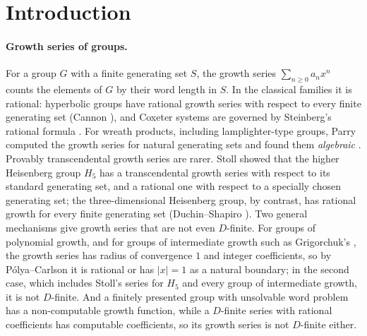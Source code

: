 \documentclass[11pt]{article}
\theoremstyle{plain}
\theoremstyle{definition}
\theoremstyle{remark}
\theoremstyle{plain}\newtheorem*{maintheorem}{Main Theorem}
\begin{document}
\section{Introduction}\label{sec:intro}

\paragraph{Growth series of groups.} For a group $G$ with a finite generating set $S$, the growth
series $\sum_{n\ge0}a_nx^n$ counts the elements of $G$ by their word length in $S$. In the
classical families it is rational: hyperbolic groups have rational growth series with respect to
every finite generating set (Cannon \cite{Cannon1984}), and Coxeter systems are governed by
Steinberg's rational formula \cite[\S5.12]{Humphreys1990}. For wreath products, including
lamplighter-type groups, Parry computed the growth series for natural generating sets and found
them \emph{algebraic} \cite{Parry1992}. Provably transcendental growth series are rarer. Stoll
\cite{Stoll1996} showed that the higher Heisenberg group $H_5$ has a transcendental growth series
with respect to its standard generating set, and a rational one with respect to a specially chosen
generating set; the three-dimensional Heisenberg group, by contrast, has rational growth for every
finite generating set (Duchin--Shapiro \cite{DuchinShapiro2019}). Two general mechanisms give growth
series that are not even $D$-finite. For groups of polynomial growth, and for groups of
intermediate growth such as Grigorchuk's \cite{Grigorchuk1984}, the growth series has radius of
convergence $1$ and integer coefficients, so by P\'olya--Carlson \cite{Carlson1921} it is rational
or has $|x|=1$ as a natural boundary; in the second case, which includes Stoll's series for $H_5$
and every group of intermediate growth, it is not $D$-finite. And a finitely presented group with
unsolvable word problem has a non-computable growth function, while a $D$-finite series with
rational coefficients has computable coefficients, so its growth series is not $D$-finite either.
\end{document}
